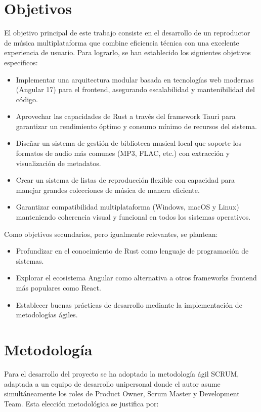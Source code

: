 \documentclass[11pt, a4paper]{article}
\begin{document}
\section{Objetivos}

El objetivo principal de este trabajo consiste en el desarrollo de un reproductor de música multiplataforma que combine eficiencia técnica con una excelente experiencia de usuario. Para lograrlo, se han establecido los siguientes objetivos específicos:

\begin{itemize}
    \item Implementar una arquitectura modular basada en tecnologías web modernas (Angular 17) para el frontend, asegurando escalabilidad y mantenibilidad del código.
    \item Aprovechar las capacidades de Rust a través del framework Tauri para garantizar un rendimiento óptimo y consumo mínimo de recursos del sistema.
    \item Diseñar un sistema de gestión de biblioteca musical local que soporte los formatos de audio más comunes (MP3, FLAC, etc.) con extracción y visualización de metadatos.
    \item Crear un sistema de listas de reproducción flexible con capacidad para manejar grandes colecciones de música de manera eficiente.
    \item Garantizar compatibilidad multiplataforma (Windows, macOS y Linux) manteniendo coherencia visual y funcional en todos los sistemas operativos.
\end{itemize}

Como objetivos secundarios, pero igualmente relevantes, se plantean:
\begin{itemize}
    \item Profundizar en el conocimiento de Rust como lenguaje de programación de sistemas.
    \item Explorar el ecosistema Angular como alternativa a otros frameworks frontend más populares como React.
    \item Establecer buenas prácticas de desarrollo mediante la implementación de metodologías ágiles.
\end{itemize}


\section{Metodología}

Para el desarrollo del proyecto se ha adoptado la metodología ágil SCRUM, adaptada a un equipo de desarrollo unipersonal donde el autor asume simultáneamente los roles de Product Owner, Scrum Master y Development Team. Esta elección metodológica se justifica por:
\end{document}
